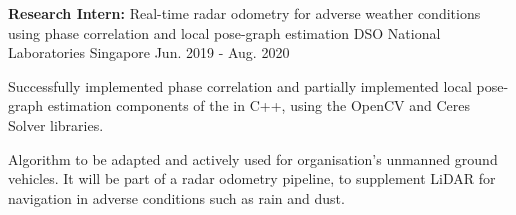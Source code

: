 


\begin{cventries}


\label{radarOdometry}

\cventry
{
	\textbf{Research Intern:} Real-time radar odometry for adverse weather conditions using phase correlation and local pose-graph estimation
} %
{DSO National Laboratories} %
{Singapore} %
{Jun. 2019 - Aug. 2020} %
{ %
	\begin{cvitems}
		\item { Successfully implemented phase correlation and partially implemented local pose-graph estimation components of the  in C++, using the OpenCV and Ceres Solver libraries.}
		\item { Algorithm to be adapted and actively used for organisation's unmanned ground vehicles. It will be part of a radar odometry pipeline, to supplement LiDAR for navigation in adverse conditions such as rain and dust. }
	\end{cvitems}
}


\label{computerVisionProjectCMU}


\end{cventries}

